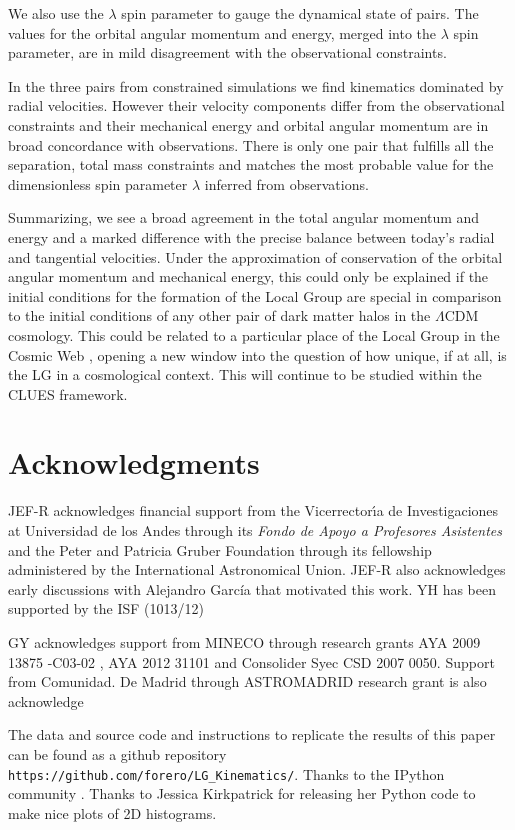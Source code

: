 \documentclass{emulateapj}
\begin{document}
We also use the $\lambda$ spin parameter to gauge
the dynamical state of pairs. The values for the orbital angular momentum
and energy, merged into the $\lambda$ spin parameter, are in mild
disagreement with the observational constraints. 


In the three pairs from constrained simulations we find kinematics
dominated by radial velocities. However their velocity components
differ from the observational constraints and their mechanical energy
and orbital angular momentum are in broad concordance with
observations. There is only one pair that fulfills all the
separation, total mass constraints and matches the most probable value
for the dimensionless spin parameter $\lambda$ inferred from
observations.  


Summarizing, we see a broad agreement in the total angular
momentum and energy and a marked difference with the precise balance
between today's radial and tangential velocities. Under the
approximation of conservation of the orbital angular momentum and
mechanical energy, this could only be explained if the initial
conditions for the formation of the Local Group are special in
comparison to the initial conditions of any other pair of dark matter
halos in the $\Lambda$CDM cosmology. This could be related to a
particular place of the Local Group in the Cosmic Web
\citep{Forero-Romero09,Hoffman12}, opening a new window into the
question of how unique, if at all, is the LG in a cosmological
context. This will continue to be studied within the CLUES framework.


\label{sec:conclusions}
\section*{Acknowledgments}  
JEF-R acknowledges financial support from the Vicerrector\'{\i}a de
Investigaciones at Universidad de los Andes through its {\it Fondo de
  Apoyo a Profesores Asistentes} and the Peter and Patricia Gruber
Foundation through its fellowship administered by the International
Astronomical Union. JEF-R also acknowledges early discussions with
Alejandro Garc\'ia that motivated this work. YH has been supported by
the ISF (1013/12) 

GY  acknowledges support from MINECO through research grants AYA 2009
13875 -C03-02 , AYA 2012 31101  and Consolider Syec CSD 2007 0050.
Support from Comunidad. De Madrid  through ASTROMADRID research grant
is also acknowledge  

The data and source code and instructions to replicate the results of
this paper can be found as a github repository {\texttt{https://github.com/forero/LG\_Kinematics/}}. Thanks to the IPython
community \citep{IPython}. Thanks to Jessica Kirkpatrick for releasing
her Python code to make nice plots of 2D histograms.  
\end{document}
